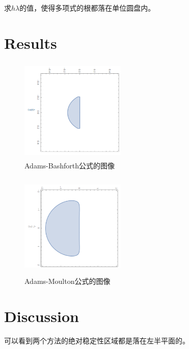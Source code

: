 \documentclass{article}
\begin{document}
	求$h\lambda$的值，使得多项式的根都落在单位圆盘内。
	
	\section{Results}
	
		\begin{figure}[H]
		\begin{center}
			
			\includegraphics[width=5cm,height=5cm]{Bashforthgraph}
			
			\caption{Adams-Bashforth公式的图像} \label{Bashforthgraph.label}
		\end{center}
	\end{figure}
	
	\begin{figure}[H]
		\begin{center}
			
			\includegraphics[width=5cm,height=5cm]{Moultongraph}
			
			\caption{Adams-Moulton公式的图像} \label{Moultongraph.label}
		\end{center}
	\end{figure}


	\section{Discussion}
	
    可以看到两个方法的绝对稳定性区域都是落在左半平面的。
	
\end{document}
